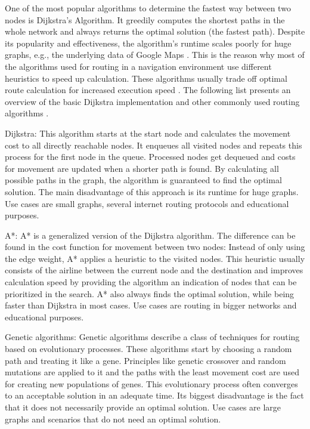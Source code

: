 One of the most popular algorithms to determine the fastest way between two nodes is Dijkstra's Algorithm. It greedily computes the shortest paths in the whole network and always returns the optimal solution (the fastest path). Despite its popularity and effectiveness, the algorithm's runtime scales poorly for huge graphs, e.g., the underlying data of Google Maps \cite{google_maps}. This is the reason why most of the algorithms used for routing in a navigation environment use different heuristics to speed up calculation. These algorithms usually trade off optimal route calculation for increased execution speed \cite{routing_algorithms}. The following list presents an overview of the basic Dijkstra implementation and other commonly used routing algorithms \cite{routing_algorithms}.

Dijkstra: This algorithm starts at the start node and calculates the movement cost to all directly reachable nodes. It enqueues all visited nodes and repeats this process for the first node in the queue. Processed nodes get dequeued and costs for movement are updated when a shorter path is found. By calculating all possible paths in the graph, the algorithm is guaranteed to find the optimal solution. The main disadvantage of this approach is its runtime for huge graphs. Use cases are small graphs, several internet routing protocols and educational purposes.

A*: A* is a generalized version of the Dijkstra algorithm. The difference can be found in the cost function for movement between two nodes: Instead of only using the edge weight, A* applies a heuristic to the visited nodes. This heuristic usually consists of the airline between the current node and the destination and improves calculation speed by providing the algorithm an indication of nodes that can be prioritized in the search. A* also always finds the optimal solution, while being faster than Dijkstra in most cases. Use cases are routing in bigger networks and educational purposes.

Genetic algorithms: Genetic algorithms describe a class of techniques for routing based on evolutionary processes. These algorithms start by choosing a random path and treating it like a gene. Principles like genetic crossover and random mutations are applied to it and the paths with the least movement cost are used for creating new populations of genes. This evolutionary process often converges to an acceptable solution in an adequate time. Its biggest disadvantage is the fact that it does not necessarily provide an optimal solution. Use cases are large graphs and scenarios that do not need an optimal solution.

